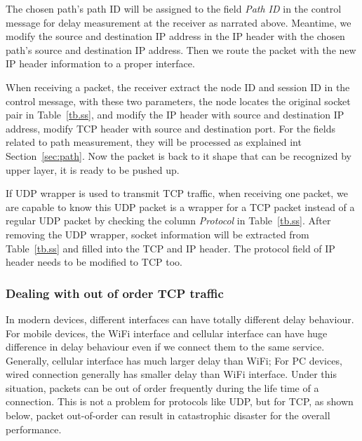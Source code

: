 The chosen path's path ID will be assigned to the field \emph{Path ID} in the control message for delay measurement at the receiver as narrated above. Meantime, we modify the source and destination IP address in the IP header with the chosen path's source and destination IP address. Then we route the packet with the new IP header information to a proper interface.

When receiving a packet, the receiver extract the node ID and session ID in the control message, with these two parameters, the node locates the original socket pair in Table~\ref{tb.ss}, and modify the IP header with source and destination IP address, modify TCP header with source and destination port. For the fields related to path measurement, they will be processed as explained int Section~\ref{sec:path}. Now the packet is back to it shape that can be recognized by upper layer, it is ready to be pushed up.

If UDP wrapper is used to transmit TCP traffic, when receiving one packet, we are capable to know this UDP packet is a wrapper for a TCP packet instead of a regular UDP packet by checking the column \emph{Protocol} in Table~\ref{tb.ss}. After removing the UDP wrapper, socket information will be extracted from Table~\ref{tb.ss} and filled into the TCP and IP header. The protocol field of IP header needs to be modified to TCP too.

%


\subsubsection{Dealing with out of order TCP traffic}

In modern devices, different interfaces can have totally different delay behaviour. For mobile devices, the WiFi interface and cellular interface can have huge difference in delay behaviour even if we connect them to the same service. Generally, cellular interface has much larger delay than WiFi; For PC devices, wired connection generally has smaller delay than WiFi interface. Under this situation, packets can be out of order frequently during the life time of a connection. This is not a problem for protocols like UDP, but for TCP, as shown below, packet out-of-order can result in catastrophic disaster for the overall performance.

